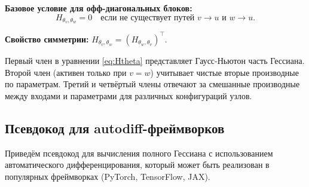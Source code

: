 \documentclass[11pt]{article}
\begin{document}
\textbf{Базовое условие для офф-диагональных блоков:}
\[
  H_{\theta_v,\theta_w}=0
  \quad\text{если не существует путей }v\to u\text{ и }w\to u.
\]

\textbf{Свойство симметрии:} $H_{\theta_v,\theta_w}=(H_{\theta_w,\theta_v})^\top$.

Первый член в уравнении \eqref{eq:Htheta} представляет Гаусс-Ньютон часть Гессиана. Второй член (активен
только при $v=w$) учитывает чистые вторые производные по параметрам. Третий и четвёртый члены отвечают за
смешанные производные между входами и параметрами для различных конфигураций узлов.

\subsection{Псевдокод для autodiff-фреймворков}

Приведём псевдокод для вычисления полного Гессиана с использованием автоматического дифференцирования,
который может быть реализован в популярных фреймворках (PyTorch, TensorFlow, JAX).
\end{document}
